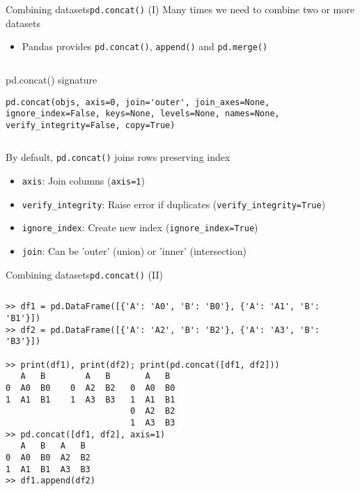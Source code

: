 \documentclass[10pt,compress]{beamer} %
\begin{document}
\begin{frame}[fragile]{Combining datasets}{\texttt{pd.concat()} (I)}
	Many times we need to combine two or more datasets
	\begin{itemize}
		\item Pandas provides \texttt{pd.concat()}, \texttt{append()} and \texttt{pd.merge()}
	\end{itemize}

	\begin{columns}
	\begin{block}{pd.concat() signature}
	\vspace{-0.2cm} 
		\begin{lstlisting}
pd.concat(objs, axis=0, join='outer', join_axes=None, ignore_index=False, keys=None, levels=None, names=None, verify_integrity=False, copy=True)
\end{lstlisting}
		\vspace{-0.2cm} 
	\end{block}
	\end{columns}

	By default, \texttt{pd.concat()} joins rows preserving index
	\begin{itemize}
		\item \texttt{axis}: Join columns (\texttt{axis=1})
		\item \texttt{verify\_integrity}: Raise error if duplicates (\texttt{verify\_integrity=True})
		\item \texttt{ignore\_index}: Create new index (\texttt{ignore\_index=True})
		\item \texttt{join}: Can be 'outer' (union) or 'inner' (intersection)
	\end{itemize}
\end{frame}

\begin{frame}[fragile]{Combining datasets}{\texttt{pd.concat()} (II)}
	\begin{columns}
 	   \column{1.1\textwidth}
		\begin{exampleblock}{}
		\vspace{-0.2cm} 
			\begin{lstlisting}
>> df1 = pd.DataFrame([{'A': 'A0', 'B': 'B0'}, {'A': 'A1', 'B': 'B1'}])
>> df2 = pd.DataFrame([{'A': 'A2', 'B': 'B2'}, {'A': 'A3', 'B': 'B3'}])

>> print(df1), print(df2); print(pd.concat([df1, df2]))
   A   B        A   B       A   B
0  A0  B0    0  A2  B2   0  A0  B0
1  A1  B1    1  A3  B3   1  A1  B1
                         0  A2  B2
                         1  A3  B3
>> pd.concat([df1, df2], axis=1)
   A   B   A   B
0  A0  B0  A2  B2
1  A1  B1  A3  B3
>> df1.append(df2)
\end{lstlisting}
			\vspace{-0.2cm} 
		\end{exampleblock}
		\end{columns}
\end{frame}
\end{document}

